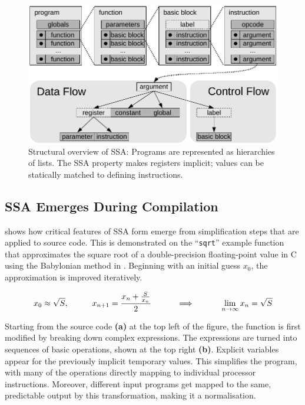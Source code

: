 \begin{figure}[h]
\centering
\includegraphics[width=\textwidth]{figures/ssaoverview}
\caption{Structural overview of SSA: Programs are represented as hierarchies of
    lists. The SSA property makes registers implicit; values can be statically
    matched to defining instructions.}
\label{fig:ssaoverview}
\end{figure}

\subsection{SSA Emerges During Compilation}

     shows how critical features of SSA form emerge from
    simplification steps that are applied to source code.
    This is demonstrated on the ``{\tt sqrt}'' example function that
    approximates the square root of a double-precision floating-point value
    in C using the Babylonian method in .
    Beginning with an initial guess $x_0$, the approximation is improved
    iteratively.

\begin{equation}
    x_0\approx\sqrt{S},\text{\hspace{1cm}}
    x_{n+1}=\frac{x_n+\frac{S}{x_n}}{2}\text{\hspace{1cm}}
    \implies\text{\hspace{1cm}}
    \lim_{n\rightarrow\infty}x_n=\sqrt{S}
    \label{babylonian_equation}
\end{equation}

    Starting from the source code {\bf(a)} at the top left of the figure, the
    function is first modified by breaking down complex expressions.
    The expressions are turned into sequences of basic operations, shown at the
    top right {\bf(b)}.
    Explicit variables appear for the previously implicit temporary values.
    This simplifies the program, with many of the operations directly mapping to
    individual processor instructions.
    Moreover, different input programs get mapped to the same,
    predictable output by this transformation, making it a normalisation.

